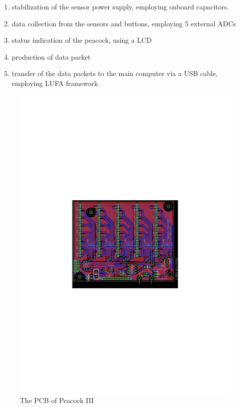 \documentclass{nime-alternate}
\begin{document}
\begin{enumerate}
       \item stabilization of the sensor power supply, employing onboard capacitors.
       \item data collection from the sensors and buttons, employing 5 external ADCs
       \item status indication of the peacock, using a LCD
       \item production of data packet 
       \item transfer of the data packets to the main computer via a USB cable, employing LUFA framework
\end{enumerate}

\begin{figure}[htbp]
       \centering
              \includegraphics[width=1\columnwidth]{board}
       \caption{The PCB of Peacock III}
       \label{fig:board}
\end{figure}
\end{document}
